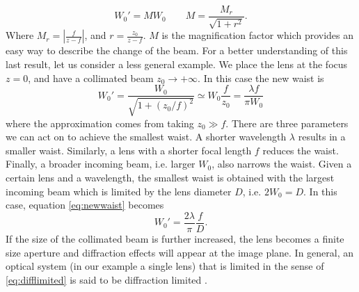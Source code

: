 \begin{equation}
W_0' = MW_0 \qquad M = \frac{M_r}{\sqrt{1+r^2}}.
\end{equation}
Where $M_r = \left|\frac{f}{z-f}\right|$, and $r = \frac{z_0}{z-f}$. $M$ is the magnification factor which provides an easy way to describe the change of the beam. For a better understanding of this last result, let us consider a less general example. We place the lens at the focus $z=0$, and have a collimated beam $z_0 \to +\infty $. In this case the new waist is
\begin{equation}
\label{eq:newwaist}
W_0' = \frac{W_0}{\sqrt{1 + (z_0/f)^2}} \simeq W_0\frac{f}{z_0} = \frac{\lambda f}{\pi W_0}
\end{equation}
where the approximation comes from taking $z_0\gg f$. There are three parameters we can act on to achieve the smallest waist. A shorter wavelength $\lambda$ results in a smaller waist. Similarly, a lens with a shorter focal length $f$ reduces the waist. Finally, a broader incoming beam, i.e. larger $W_0$, also narrows the waist. Given a certain lens and a wavelength, the smallest waist is obtained with the largest incoming beam which is limited by the lens diameter $D$, i.e. $2W_0 = D$. In this case, equation \ref{eq:newwaist} becomes
\begin{equation}
\label{eq:difflimited}
W_0' = \frac{2\lambda}{\pi} \frac{f}{D}.
\end{equation}
If the size of the collimated beam is further increased, the lens becomes a finite size aperture and diffraction effects will appear at the image plane. In general, an optical system (in our example a single lens) that is limited in the sense of \eqref{eq:difflimited} is said to be diffraction limited \cite{diocane}.

